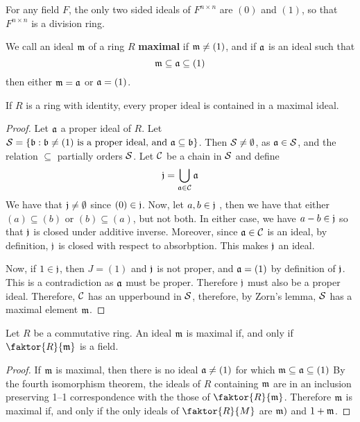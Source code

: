 \begin{example}\label{example_5.14}
  For any field $F$, the only two sided ideals of  $F^{n \times n}$ are $(0)$
  and $(1)$, so that $F^{n \times n}$ is a division ring.
\end{example}

\begin{definition}
  We call an ideal $\mathfrak{m}$ of a ring  $R$  \textbf{maximal} if $\mathfrak{m} \neq
  (1)$, and if $\mathfrak{a}$ is an ideal such that
  \begin{equation*}
    \mathfrak{m} \subseteq \mathfrak{a} \subseteq (1)
  \end{equation*}
  then either $\mathfrak{m}=\mathfrak{a}$ or $\mathfrak{a}=(1)$.
\end{definition}

\begin{lemma}\label{lemma_5.4.2}
  If $R$ is a ring with identity, every proper ideal is contained in a maximal
  ideal.
\end{lemma}
\begin{proof}
  Let $\mathfrak{a}$ a proper ideal of $R$. Let $\mathcal{S}=\{\mathfrak{b} : \mathfrak{b} \neq (1) \text{ is a proper
  ideal, and } \mathfrak{a} \subseteq \mathfrak{b} \}$. Then $\mathcal{S} \neq \emptyset$, as
  $\mathfrak{a} \in \mathcal{S}$, and the relation $\subseteq$ partially orders $\mathcal{S}$. Let
  $\mathcal{C}$ be a chain in $\mathcal{S}$ and define
  \begin{equation*}
    \mathfrak{j}=\bigcup_{\mathfrak{a} \in \mathcal{C}}{\mathfrak{a}}
  \end{equation*}
  We have that $\mathfrak{j} \neq \emptyset$ since  $(0) \in \mathfrak{j}$. Now, let
  $a,b \in \mathfrak{j}$ , then we have that either  $(a) \subseteq (b)$ or
  $(b) \subseteq (a)$, but not both. In either case, we have $a-b \in \mathfrak{j}$
  so that  $\mathfrak{j}$ is closed under additive inverse. Moreover, since
  $\mathfrak{a} \in \mathcal{C}$ is an ideal, by definition, $\mathfrak{j}$ is closed with respect to
  absorbption. This makes  $\mathfrak{j}$ an ideal.

  Now, if  $1 \in \mathfrak{j}$, then $J=(1)$ and $\mathfrak{j}$ is not proper, and $\mathfrak{a}=(1)$ by
  definition of $\mathfrak{j}$. This is a contradiction as $\mathfrak{a}$ must be
  proper. Therefore $\mathfrak{j}$ must also be a proper ideal. Therefore,
  $\mathcal{C}$ has an upperbound in $\mathcal{S}$, therefore, by Zorn's lemma,
  $\mathcal{S}$ has a maximal element $\mathfrak{m}$.
\end{proof}

\begin{lemma}\label{lemma_5.4.3}
  Let $R$ be a commutative ring. An ideal $\mathfrak{m}$ is maximal if, and only if
  $\faktor{R}{\mf}$ is a field.
\end{lemma}
\begin{proof}
  If $\mathfrak{m}$ is maximal, then there is no ideal $\mathfrak{a} \neq (1)$ for which
  $\mathfrak{m} \subseteq \mathfrak{a} \subseteq (1)$ By the fourth isomorphism theorem,
  the ideals of  $R$ containing $\mathfrak{m}$ are in an inclusion preserving 1--1
  correspondence with the those of $\faktor{R}{\mf}$. Therefore $\mathfrak{m}$ is
  maximal if, and only if the only ideals of $\faktor{R}{M}$ are
  $\mathfrak{m})$ and $1+\mathfrak{m}$.
\end{proof}

